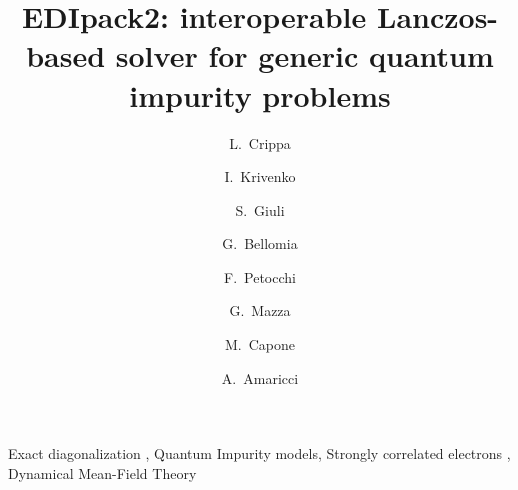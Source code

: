 \documentclass[final,3p,10pt]{elsarticle}
\begin{document}
\begin{frontmatter}

\title{EDIpack2: interoperable Lanczos-based solver for generic quantum impurity problems}
\author[a]{L.~Crippa}
\author[a]{I.~Krivenko}
\author[b]{S.~Giuli}
\author[b]{G.~Bellomia}
\author[d]{F.~Petocchi}
\author[e]{G.~Mazza}
\author[b]{M.~Capone}
\author[g]{A.~Amaricci}

\newcommand{\CNRIOM}{CNR-IOM, Istituto Officina dei Materiali,
  Consiglio Nazionale delle Ricerche, Via Bonomea 265, 34136
  Trieste, Italy}
\newcommand{\SISSA}{Scuola Internazionale Superiore di Studi Avanzati (SISSA),
  Via Bonomea 265, 34136 Trieste, Italy}
\newcommand{\ITPHamburg}{I. Institute of Theoretical Physics,
  University of Hamburg, Notkestrasse 9, 22607 Hamburg, Germany}
\newcommand{\WZBURG}{Institut f\"ur Theoretische Physik und
  Astrophysik,Universit\"at W\"urzburg, 97074 W\"urzburg, Germany}
\newcommand{\CTQMAT}{W\"urzburg-Dresden Cluster of Excellence ct.qmat, 01062 Dresden, Germany}
\newcommand{\Geneve}{Department of Quantum Matter Physics, University of
  Geneva, Quai Ernest-Ansermet 24, 1211 Geneva, Switzerland}
\newcommand{\UPISA}{Department of Physics ``E. Fermi'' University of
  Pisa, Largo B. Pontecorvo 3, 56127 Pisa, Italy}
\newcommand{\ESPCI}{LPEM, ESPCI Paris, PSL Research University, CNRS, Sorbonne Universit\'e, 75005 Paris, France}

\address[a]{\ITPHamburg}
\address[b]{\SISSA}
\address[c]{Politecnico di Torino, Turin, Italy}
\address[d]{\Geneve}
\address[e]{\UPISA}
\address[f]{\ESPCI}
\address[g]{\CNRIOM}

\begin{abstract}
  
\end{abstract}

\begin{keyword}
  Exact diagonalization \sep
  Quantum Impurity models\sep  
  Strongly correlated electrons \sep  
  Dynamical Mean-Field Theory
\end{keyword}

\end{frontmatter}
\end{document}
